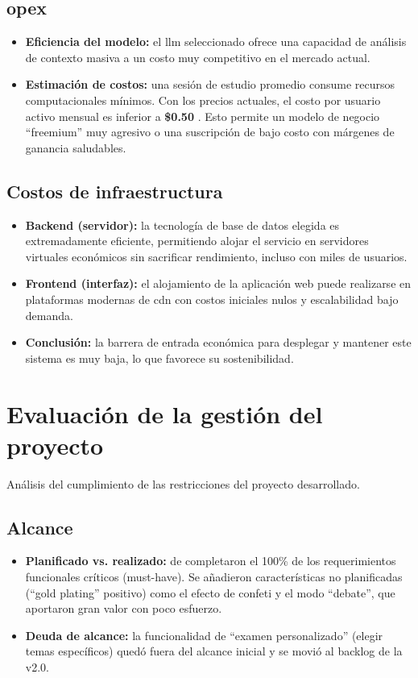 \subsection{\gls{opex}}
\begin{itemize}
\item   \textbf{Eficiencia del modelo:} el \gls{llm} seleccionado ofrece una capacidad de análisis de contexto masiva a un costo muy competitivo en el mercado actual.
\item   \textbf{Estimación de costos:} una sesión de estudio promedio consume recursos computacionales mínimos. Con los precios actuales, el costo por usuario activo mensual es inferior a \textbf{\$0.50 }. Esto permite un modelo de negocio \enquote{freemium} muy agresivo o una suscripción de bajo costo con márgenes de ganancia saludables.
\end{itemize}

\subsection{Costos de infraestructura}
\begin{itemize}
\item   \textbf{Backend (servidor):} la tecnología de base de datos elegida es extremadamente eficiente, permitiendo alojar el servicio en servidores virtuales económicos sin sacrificar rendimiento, incluso con miles de usuarios.
\item   \textbf{Frontend (interfaz):} el alojamiento de la aplicación web puede realizarse en plataformas modernas de \gls{cdn} con costos iniciales nulos y escalabilidad bajo demanda.
\item   \textbf{Conclusión:} la barrera de entrada económica para desplegar y mantener este sistema es muy baja, lo que favorece su sostenibilidad.
\end{itemize}

\section{Evaluación de la gestión del proyecto}

Análisis del cumplimiento de las restricciones del proyecto desarrollado.

\subsection{Alcance}
\begin{itemize}
\item   \textbf{Planificado vs. realizado:} de completaron el 100\% de los requerimientos funcionales críticos (must-have). Se añadieron características no planificadas (\enquote{gold plating} positivo) como el efecto de confeti y el modo \enquote{debate}, que aportaron gran valor con poco esfuerzo.
\item   \textbf{Deuda de alcance:} la funcionalidad de \enquote{examen personalizado} (elegir temas específicos) quedó fuera del alcance inicial y se movió al backlog de la v2.0.
\end{itemize}

